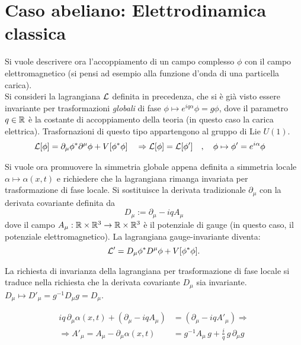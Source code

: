 \section{Caso abeliano: Elettrodinamica classica}
Si vuole descrivere ora l'accoppiamento di un campo complesso $\phi$ con il campo
elettromagnetico (si pensi ad esempio alla funzione d'onda di una particella carica).\\
Si consideri la lagrangiana $\mathcal{L}$ definita in precedenza, che si è già visto
essere invariante per trasformazioni \emph{globali} di fase $\phi \mapsto e^{iq\alpha}\phi = g\phi$,
dove il parametro $q \in \mathbb{R}$ è la costante di accoppiamento della teoria
(in questo caso la carica elettrica). Trasfornazioni di questo tipo appartengono
al gruppo di Lie $U(1)$.
%
\begin{equation*}
  \begin{aligned}
     \mathcal{L} [\phi] & = \partial _\mu \phi^*  \partial ^\mu \phi + V[\phi ^* \phi] &
     & \Rightarrow \mathcal{L}[\phi] = \mathcal{L}[\phi'] & ,\quad
     \phi &\mapsto \phi' = e^{i\alpha}\phi
  \end{aligned}
\end{equation*}

Si vuole ora promuovere la simmetria globale appena definita a simmetria locale
$\alpha \mapsto \alpha(x,t)$ e richiedere che la lagrangiana rimanga invariata
per trasformazione di fase locale.
Si sostituisce la derivata tradizionale $\partial _\mu$ con la derivata covariante
definita da
%
$$
   D _\mu := \partial _\mu -iq A _\mu
$$
dove il campo $A _\mu : \mathbb{R} \times \mathbb{R}^3 \to \mathbb{R} \times \mathbb{R}^3$ è il potenziale
di gauge (in questo caso, il potenziale elettromagnetico). La lagrangiana
gauge-invariante diventa:
$$
   \mathcal{L} ' =  D _\mu \phi^*  D ^\mu \phi + V[\phi ^* \phi].
$$

La richiesta di invarianza della lagrangiana per trasformazione
di fase locale si traduce nella richiesta che la derivata covariante $D _\mu$
sia invariante. $D _\mu \mapsto D' _\mu = g^{-1} D _\mu g = D _\mu $.

\begin{equation}
   \begin{aligned}
      iq \, \partial _\mu \alpha(x,t) + (\partial _\mu - iq A _\mu)
         & = (\partial _\mu -iq A' _\mu) \Rightarrow \\
      \Rightarrow A' _\mu = A _\mu - \partial _\mu  \alpha(x,t)
         & = g ^{-1} A _\mu \, g + \frac{i}{q} \, g \, \partial _\mu g
   \end{aligned}
\end{equation}

